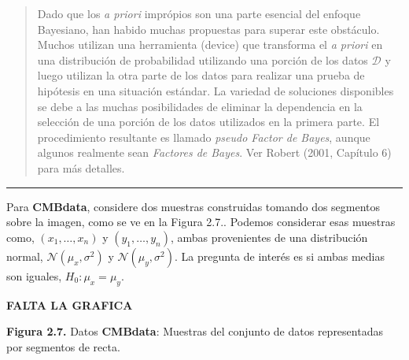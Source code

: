 \documentclass[12pt,]{article}
\begin{document}
\begin{quote}
Dado que los \emph{a priori} imprópios son una parte esencial del
enfoque Bayesiano, han habido muchas propuestas para superar este
obstáculo. Muchos utilizan una herramienta (device) que transforma el
\emph{a priori} en una distribución de probabilidad utilizando una
porción de los datos \(\mathcal{D}\) y luego utilizan la otra parte de
los datos para realizar una prueba de hipótesis en una situación
estándar. La variedad de soluciones disponibles se debe a las muchas
posibilidades de eliminar la dependencia en la selección de una porción
de los datos utilizados en la primera parte. El procedimiento resultante
es llamado \emph{pseudo Factor de Bayes}, aunque algunos realmente sean
\emph{Factores de Bayes}. Ver Robert (2001, Capítulo 6) para más
detalles.
\end{quote}

\begin{center}\rule{0.5\linewidth}{\linethickness}\end{center}

Para \textbf{CMBdata}, considere dos muestras construidas tomando dos
segmentos sobre la imagen, como se ve en la Figura 2.7.. Podemos
considerar esas muestras como, \((x_1,\ldots,x_n)\) y
\((y_1,\ldots,y_n)\), ambas provenientes de una distribución normal,
\(\mathcal{N}(\mu_x, \sigma^2)\) y \(\mathcal{N}(\mu_y, \sigma^2)\). La
pregunta de interés es si ambas medias son iguales, \(H_0:\mu_x=\mu_y\).

\textbf{FALTA LA GRAFICA}

\textbf{Figura 2.7.} Datos \textbf{CMBdata}: Muestras del conjunto de
datos representadas por segmentos de recta.
\end{document}

